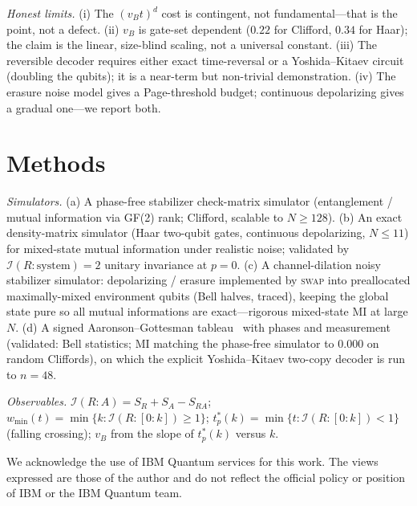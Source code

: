 \documentclass[aps,prxquantum,twocolumn,superscriptaddress,longbibliography]{revtex4-2}
\newcommand{\vB}{v_{B}}
\newcommand{\I}{\mathcal{I}}
\begin{document}
\emph{Honest limits.} (i) The $(\vB t)^{d}$ cost is contingent, not fundamental---that is the
point, not a defect. (ii) $\vB$ is gate-set dependent ($0.22$ for Clifford, $0.34$ for Haar); the
claim is the linear, size-blind scaling, not a universal constant. (iii) The reversible decoder
requires either exact time-reversal or a Yoshida--Kitaev circuit (doubling the qubits); it is a
near-term but non-trivial demonstration. (iv) The erasure noise model gives a Page-threshold
budget; continuous depolarizing gives a gradual one---we report both.

\section{Methods}

\emph{Simulators.} (a) A phase-free stabilizer check-matrix simulator (entanglement / mutual
information via GF(2) rank; Clifford, scalable to $N\ge128$). (b) An exact density-matrix simulator
(Haar two-qubit gates, continuous depolarizing, $N\le11$) for mixed-state mutual information under
realistic noise; validated by $\I(R{:}\mathrm{system})=2$ unitary invariance at $p=0$. (c) A
channel-dilation noisy stabilizer simulator: depolarizing / erasure implemented by \textsc{swap}
into preallocated maximally-mixed environment qubits (Bell halves, traced), keeping the global state
pure so all mutual informations are exact---rigorous mixed-state MI at large $N$. (d) A signed
Aaronson--Gottesman tableau~\cite{aaronson2004} with phases and measurement (validated: Bell
statistics; MI matching the phase-free simulator to $0.000$ on random Cliffords), on which the
explicit Yoshida--Kitaev two-copy decoder is run to $n=48$.

\emph{Observables.} $\I(R{:}A)=S_{R}+S_{A}-S_{RA}$;
$w_{\min}(t)=\min\{k:\I(R{:}[0{:}k])\ge1\}$;
$t^{*}_{p}(k)=\min\{t:\I(R{:}[0{:}k])<1\}$ (falling crossing); $\vB$ from the slope of $t^{*}_{p}(k)$
versus $k$.

\begin{acknowledgments}
We acknowledge the use of IBM Quantum services for this work. The views expressed are those of the
author and do not reflect the official policy or position of IBM or the IBM Quantum team.
\end{acknowledgments}


\end{document}
